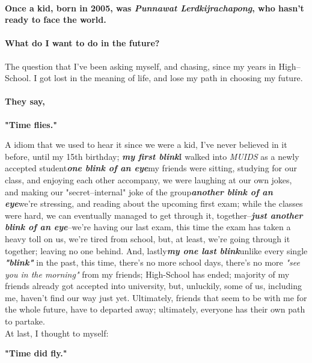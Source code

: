 \documentclass[11pt]{book}
\begin{document}
\paragraph{Once a kid, born in 2005, was \textit{Punnawat Lerdkijrachapong}, who hasn't ready to face the world.}

\paragraph{What do I want to do in the future?}
The question that I've been asking myself, and chasing, since my years in High--School. I got lost in the meaning of life, and lose my path in choosing my future.

\paragraph{They say,}
	\begin{center}
		\textbf{"Time flies."}
	\end{center}


A idiom that we used to hear it since we were a kid, I've never believed in it before, until my 15th birthday; \textbf{\textit{my first blink}}\textemdash I walked into \textit{MUIDS} as a newly accepted student\textemdash\textbf{\textit{one blink of an eye}}\textemdash my friends were sitting, studying for our class, and enjoying each other accompany, we were laughing at our own jokes, and making our "secret--internal" joke of the group\textemdash\textbf{\textit{another blink of an eye}}\textemdash we're stressing, and reading about the upcoming first exam; while the classes were hard, we can eventually managed to get through it, together--\textbf{\textit{just another blink of an eye}}--we're having our last exam, this time the exam has taken a heavy toll on us, we're tired from school, but, at least, we're going through it together; leaving no one behind. And, lastly\textemdash\textbf{\textit{my one last blink}}\textemdash unlike every single \textbf{\textit{"blink"}} in the past, this time, there's no more school days, there's no more \textit{"see you in the morning"} from my friends; High-School has ended; majority of my friends already got accepted into university, but, unluckily, some of us, including me, haven't find our way just yet. Ultimately, friends that seem to be with me for the whole future, have to departed away; ultimately, everyone has their own path to partake.\\

At last, I thought to myself:\\
	\begin{center}
		\textbf{"Time did fly."}\\		
	\end{center}
\end{document}
